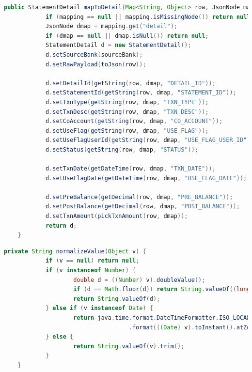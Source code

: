 \begin{lstlisting}[language=Java, caption=StatementDetail объект үүсгэх, frame=single]
	public StatementDetail mapToDetail(Map<String, Object> row, JsonNode mapping, String sourceBank) {
			if (mapping == null || mapping.isMissingNode()) return null;
			JsonNode dmap = mapping.get("detail");
			if (dmap == null || dmap.isNull()) return null;
			StatementDetail d = new StatementDetail();
			d.setSourceBank(sourceBank);
			d.setRawPayload(toJson(row));

			d.setDetailId(getString(row, dmap, "DETAIL_ID"));
			d.setStatementId(getString(row, dmap, "STATEMENT_ID"));
			d.setTxnType(getString(row, dmap, "TXN_TYPE"));
			d.setTxnDesc(getString(row, dmap, "TXN_DESC"));
			d.setCoAccount(getString(row, dmap, "CO_ACCOUNT"));
			d.setUseFlag(getString(row, dmap, "USE_FLAG"));
			d.setUseFlagUserId(getString(row, dmap, "USE_FLAG_USER_ID"));
			d.setStatus(getString(row, dmap, "STATUS"));

			d.setTxnDate(getDateTime(row, dmap, "TXN_DATE"));
			d.setUseFlagDate(getDateTime(row, dmap, "USE_FLAG_DATE"));

			d.setPreBalance(getDecimal(row, dmap, "PRE_BALANCE"));
			d.setPostBalance(getDecimal(row, dmap, "POST_BALANCE"));
			d.setTxnAmount(pickTxnAmount(row, dmap));
			return d;
	}
\end{lstlisting}

\begin{lstlisting}[language=Java, caption=Өгөгдлийн төрөл хувиргалт, frame=single]
	private String normalizeValue(Object v) {
			if (v == null) return null;
			if (v instanceof Number) {
					double d = ((Number) v).doubleValue();
					if (d == Math.floor(d)) return String.valueOf((long) d);
					return String.valueOf(d);
			} else if (v instanceof Date) {
					return java.time.format.DateTimeFormatter.ISO_LOCAL_DATE_TIME
									.format(((Date) v).toInstant().atZone(ZoneId.systemDefault()).toLocalDateTime());
			} else {
					return String.valueOf(v).trim();
			}
	}
\end{lstlisting}

